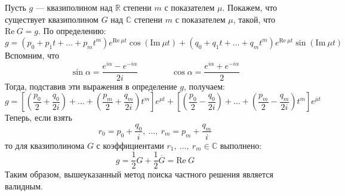 \documentclass[a4paper,12pt]{article}
\renewcommand{\Re}{\mathrm{Re\:}}
\renewcommand{\Im}{\mathrm{Im\:}}
\newcommand{\R}{\mathbb{R}}
\renewcommand{\C}{\mathbb{C}}
\begin{document}
Пусть $g$ --- квазиполином над $\R$ степени $m$ с показателем $\mu$.
Покажем, что существует квазиполином $G$ над $\C$ степени $m$ с показателем $\mu$, такой, что $\Re G = g$.
По определению:
\[g = \left(p_0 +  p_1t + \ldots + p_mt^m\right)e^{\Re \mu t} \cos(\Im \mu t) + \left(q_0 +  q_1t + \ldots + q_mt^m\right)e^{\Re \mu t} \sin(\Im \mu t)\]
Вспомним, что
\[\sin \alpha  = \dfrac{e^{i\alpha} - e^{-i\alpha}}{2i}\qquad \qquad \cos\alpha = \dfrac{e^{i\alpha} + e^{-i\alpha}}{2}\]
Тогда, подставив эти выражения в определение $g$, получаем:
\[g = \left[\left(\dfrac{p_0}{2} + \dfrac{q_0}{2i}\right) + \ldots + \left(\dfrac{p_m}{2} + \dfrac{q_m}{2i}\right)t^m\right]e^{\mu t} + \left[\left(\dfrac{p_0}{2} - \dfrac{q_0}{2i}\right) + \ldots + \left(\dfrac{p_m}{2} - \dfrac{q_m}{2i}\right)t^m\right]e^{\overline{\mu} t}\]
Теперь, если взять 
\[r_0 = p_0 + \dfrac{q_0}{i},\ \ldots,\ r_m = p_m + \dfrac{q_m}{i}\]
то для квазиполинома $G$ с коэффициентами $r_1,\ \ldots,\ r_m \in \C$ выполнено:
\[g = \dfrac{1}{2}G + \dfrac{1}{2}\overline{G} = \Re G\]
Таким образом, вышеуказанный метод поиска частного решения является валидным.
\end{document}
